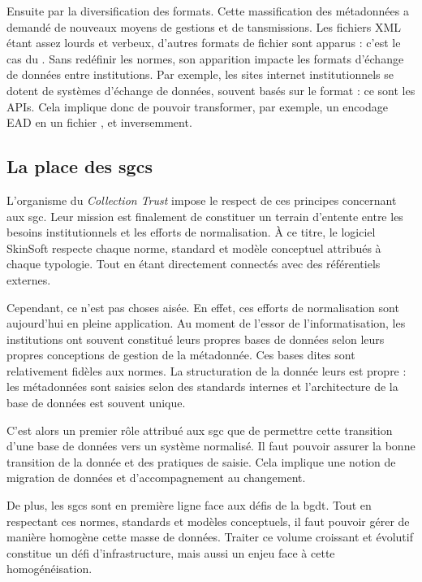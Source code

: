 Ensuite par la diversification des formats. Cette massification des métadonnées a demandé de nouveaux moyens de gestions et de tansmissions. Les fichiers XML étant assez lourds et verbeux, d'autres formats de fichier sont apparus : c'est le cas du \J. Sans redéfinir les normes, son apparition impacte les formats d'échange de données entre institutions. Par exemple, les sites internet institutionnels se dotent de systèmes d'échange de données, souvent basés sur le format \J : ce sont les APIs. Cela implique donc de pouvoir transformer, par exemple, un encodage EAD en un fichier \J, et inversemment.

\subsection{La place des \glspl{sgc}}

L'organisme du \textit{Collection Trust} impose le respect de ces principes concernant aux \gls{sgc}. Leur mission est finalement de constituer un terrain d'entente entre les besoins institutionnels et les efforts de normalisation. À ce titre, le logiciel SkinSoft respecte chaque norme, standard et modèle conceptuel attribués à chaque typologie. Tout en étant directement connectés avec des référentiels externes.\newline

Cependant, ce n'est pas choses aisée. En effet, ces efforts de normalisation sont aujourd'hui en pleine application. Au moment de l'essor de l'informatisation, les institutions ont souvent constitué leurs propres bases de données selon leurs propres conceptions de gestion de la métadonnée. Ces bases dites  sont relativement fidèles aux normes. La structuration de la donnée leurs est propre : les métadonnées sont saisies selon des standards internes et l'architecture de la base de données est souvent unique.

C'est alors un premier rôle attribué aux \gls{sgc} que de permettre cette transition d'une base de données  vers un système normalisé. Il faut pouvoir assurer la bonne transition de la donnée et des pratiques de saisie. Cela implique une notion de migration de données et d'accompagnement au changement.

De plus, les \glspl{sgc} sont en première ligne face aux défis de la \gls{bgdt}. Tout en respectant ces normes, standards et modèles conceptuels, il faut pouvoir gérer de manière homogène cette masse de données. Traiter ce volume croissant et évolutif constitue un défi d'infrastructure, mais aussi un enjeu face à cette homogénéisation. 

